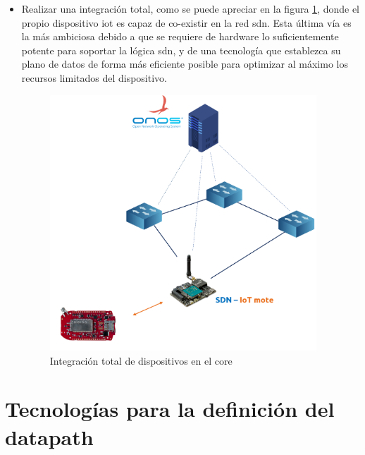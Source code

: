 \begin{itemize}
    \item \label{iot_integracionTotal}Realizar una integración total, como se puede apreciar en la figura \ref{sdn_iot_total}, donde el propio dispositivo \gls{iot} es capaz de co-existir en la red \gls{sdn}. Esta última vía es la más ambiciosa debido a que se requiere de hardware lo suficientemente potente para soportar la lógica \gls{sdn}, y de una tecnología que establezca su plano de datos de forma más eficiente posible para optimizar al máximo los recursos limitados del dispositivo.
    
    \begin{figure}[ht]
        \centering
        \includegraphics[width=10cm]{archivos/img/intro/sdn_iot_b.png}
        \caption{Integración total de dispositivos  en el core }
        \label{sdn_iot_total}
    \end{figure}
    
\end{itemize}



\section{Tecnologías para la definición del datapath}



